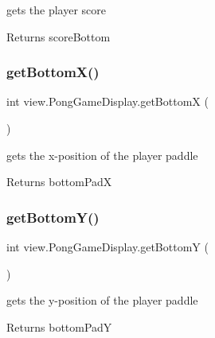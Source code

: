 gets the player score 

\begin{DoxyReturn}{Returns}
score\+Bottom 
\end{DoxyReturn}
\hypertarget{classview_1_1_pong_game_display_ab5d2d9429f7d666fea097c2ea3118893}{}\label{classview_1_1_pong_game_display_ab5d2d9429f7d666fea097c2ea3118893} 
\subsubsection{\texorpdfstring{get\+Bottom\+X()}{getBottomX()}}
{\footnotesize\ttfamily int view.\+Pong\+Game\+Display.\+get\+BottomX (\begin{DoxyParamCaption}{ }\end{DoxyParamCaption})}



gets the x-\/position of the player paddle 

\begin{DoxyReturn}{Returns}
bottom\+PadX 
\end{DoxyReturn}
\hypertarget{classview_1_1_pong_game_display_afa4d22c9959dc02057a1b56fef3f33cd}{}\label{classview_1_1_pong_game_display_afa4d22c9959dc02057a1b56fef3f33cd} 
\subsubsection{\texorpdfstring{get\+Bottom\+Y()}{getBottomY()}}
{\footnotesize\ttfamily int view.\+Pong\+Game\+Display.\+get\+BottomY (\begin{DoxyParamCaption}{ }\end{DoxyParamCaption})}



gets the y-\/position of the player paddle 

\begin{DoxyReturn}{Returns}
bottom\+PadY 
\end{DoxyReturn}
\hypertarget{classview_1_1_pong_game_display_aca0afcedba1c0868113edcf0caa63263}{}\label{classview_1_1_pong_game_display_aca0afcedba1c0868113edcf0caa63263} 
